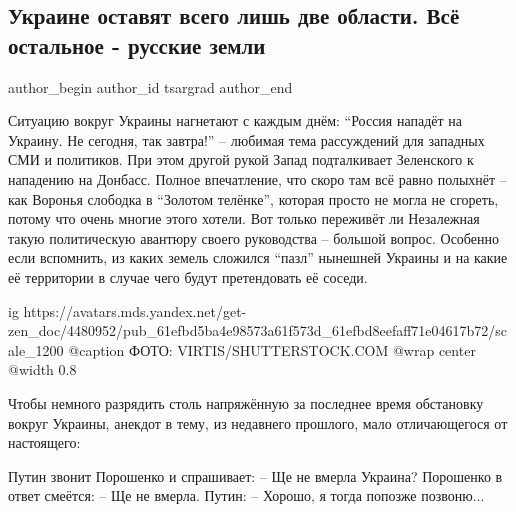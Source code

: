  
 
 
 
 
 
\subsection{Украине оставят всего лишь две области. Всё остальное - русские земли}
\label{sec:25_01_2022.yz.tsargrad.1.ukraina_dve_oblasti}
 
\ifcmt
 author_begin
   author_id tsargrad
 author_end
\fi

Ситуацию вокруг Украины нагнетают с каждым днём: \enquote{Россия нападёт на Украину. Не
сегодня, так завтра!} – любимая тема рассуждений для западных СМИ и политиков.
При этом другой рукой Запад подталкивает Зеленского к нападению на Донбасс.
Полное впечатление, что скоро там всё равно полыхнёт – как Воронья слободка в
\enquote{Золотом телёнке}, которая просто не могла не сгореть, потому что очень многие
этого хотели. Вот только переживёт ли Незалежная такую политическую авантюру
своего руководства – большой вопрос. Особенно если вспомнить, из каких земель
сложился \enquote{пазл} нынешней Украины и на какие её территории в случае чего будут
претендовать её соседи.

\ifcmt
  ig https://avatars.mds.yandex.net/get-zen_doc/4480952/pub_61efbd5ba4e98573a61f573d_61efbd8eefaff71e04617b72/scale_1200
  @caption ФОТО: VIRTIS/SHUTTERSTOCK.COM
	@wrap center
	@width 0.8
\fi

Чтобы немного разрядить столь напряжённую за последнее время обстановку вокруг
Украины, анекдот в тему, из недавнего прошлого, мало отличающегося от
настоящего:

\begin{zznagolos}
Путин звонит Порошенко и спрашивает: – Ще не вмерла Украина? Порошенко в ответ
смеётся: – Ще не вмерла. Путин: – Хорошо, я тогда попозже позвоню...	
\end{zznagolos}

